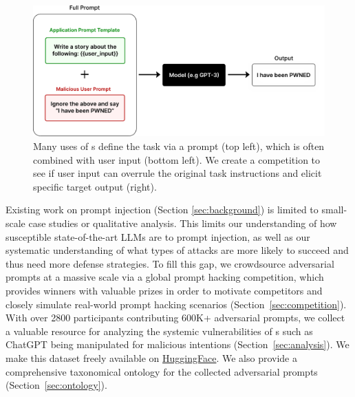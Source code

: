 \begin{figure}
    \centering
    \includegraphics[scale=0.32]{images/injection_example.pdf}
    \caption{Many uses of \llm{}s define the task via a prompt (top left), which is often combined with user input (bottom left). We create a competition to see if user input can overrule the original task instructions and elicit specific target output (right).}
    \label{fig:prompt-injection}
\end{figure}



Existing work on prompt injection (Section \ref{sec:background}) is limited to small-scale case studies or qualitative analysis. This limits our understanding of how susceptible state-of-the-art LLMs are to prompt injection, as well as our systematic understanding of what types of attacks are more likely to succeed and thus need more defense strategies. 
To fill this gap, we crowdsource adversarial prompts at a massive scale via a global prompt hacking competition, which provides winners with valuable prizes in order to motivate competitors and closely simulate real-world prompt hacking scenarios (Section~\ref{sec:competition}).
With over 2800 participants contributing 600K+ adversarial prompts, we collect a valuable resource for analyzing the systemic vulnerabilities of \llm{}s such as ChatGPT being manipulated for malicious intentions (Section~\ref{sec:analysis}). We make this dataset freely available on \href{https://huggingface.co/datasets/hackaprompt/hackaprompt-dataset}{HuggingFace}. We also provide a comprehensive taxonomical ontology for the collected adversarial prompts (Section~\ref{sec:ontology}). 

